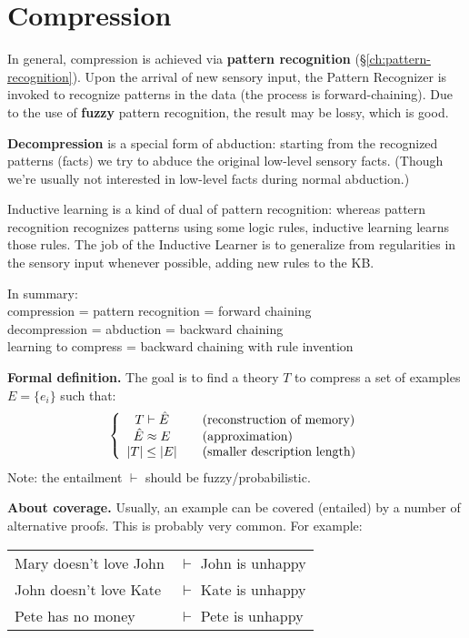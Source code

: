 \section{Compression}
\label{sec:compression}

In general, compression is achieved via \textbf{pattern recognition} (\S\ref{ch:pattern-recognition}).  Upon the arrival of new sensory input, the Pattern Recognizer is invoked to recognize patterns in the data (the process is forward-chaining).  Due to the use of \textbf{fuzzy} pattern recognition, the result may be lossy, which is good.

\textbf{Decompression} is a special form of abduction:  starting from the recognized patterns (facts) we try to abduce the original low-level sensory facts.  (Though we're usually not interested in low-level facts during normal abduction.)

Inductive learning is a kind of dual of pattern recognition:  whereas pattern recognition recognizes patterns using some logic rules, inductive learning learns those rules.  The job of the Inductive Learner is to generalize from regularities in the sensory input whenever possible, adding new rules to the KB.

In summary:\\
\hspace*{1cm} compression = pattern recognition = forward chaining\\
\hspace*{1cm} decompression = abduction = backward chaining\\
\hspace*{1cm} learning to compress = backward chaining with rule invention

\textbf{Formal definition.}  The goal is to find a theory $T$ to compress a set of examples $E = \{ e_i \}$ such that:\\
\begin{equation}
\left
\{
\begin{array}{c@{\quad\quad}l}
T \vdash \hat{E}  & \mbox{(reconstruction of memory)}\\
\hat{E} \approx E & \mbox{(approximation)}\\
|T| \leq |E|      & \mbox{(smaller description length)}
\end{array}
\right.
\end{equation}
Note:  the entailment $\vdash$ should be fuzzy/probabilistic.

\textbf{About coverage.}  Usually, an example can be covered (entailed) by a number of alternative proofs.  This is probably very common.  For example:\\
\hspace*{0.8cm} \begin{tabular}{l l}
Mary doesn't love John & $\vdash$ John is unhappy\\
John doesn't love Kate & $\vdash$ Kate is unhappy\\
Pete has no money      & $\vdash$ Pete is unhappy
\end{tabular} \vspace{-0.2cm}

